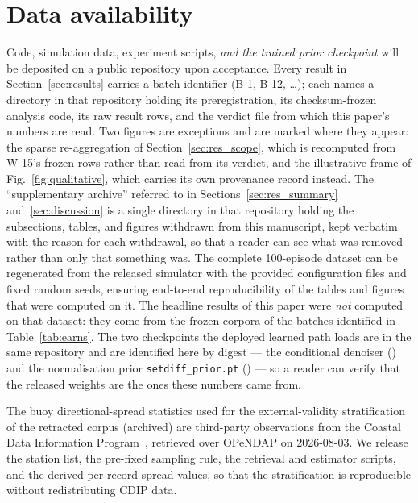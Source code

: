 \documentclass[review]{elsarticle}
\begin{document}
\appendix


\section*{Data availability}

Code, simulation data, experiment scripts, \emph{and the trained prior checkpoint}
will be deposited on a public repository upon acceptance. Every result in
Section~\ref{sec:results} carries a batch identifier (B-1, B-12, \dots); each names
a directory in that repository holding its preregistration, its checksum-frozen
analysis code, its raw result rows, and the verdict file from which this paper's
numbers are read. Two figures are exceptions and are marked where they appear: the
sparse re-aggregation of Section~\ref{sec:res_scope}, which is recomputed from
W-15's frozen rows rather than read from its verdict, and the illustrative frame of
Fig.~\ref{fig:qualitative}, which carries its own provenance record instead.
The ``supplementary archive'' referred to in Sections~\ref{sec:res_summary}
and~\ref{sec:discussion} is a single directory in that repository holding the
subsections, tables, and figures withdrawn from this manuscript, kept verbatim with
the reason for each withdrawal, so that a reader can see what was removed rather
than only that something was.
The complete 100-episode dataset can be regenerated from the released
simulator with the provided configuration files and fixed random
seeds, ensuring end-to-end reproducibility of the tables and figures that were
computed on it. The headline results of this paper were \emph{not} computed on that
dataset: they come from the frozen corpora of the batches identified in
Table~\ref{tab:earns}. The two checkpoints the deployed learned path loads are in the
same repository and are identified here by digest --- the conditional denoiser
(\texttt{\CkptShaFull{}}) and the normalisation prior
\texttt{setdiff\_prior.pt} (\texttt{\PriorCkptShaFull{}}) --- so a reader can verify
that the released weights are the ones these numbers came from.

The buoy directional-spread statistics used for the external-validity
stratification of the retracted corpus (archived) are third-party
observations from the Coastal Data Information Program~\citep{cdip},
retrieved over OPeNDAP on 2026-08-03.  We release the station list, the
pre-fixed sampling rule, the retrieval and estimator scripts, and the
derived per-record spread values, so that the stratification is
reproducible without redistributing CDIP data.
\end{document}
